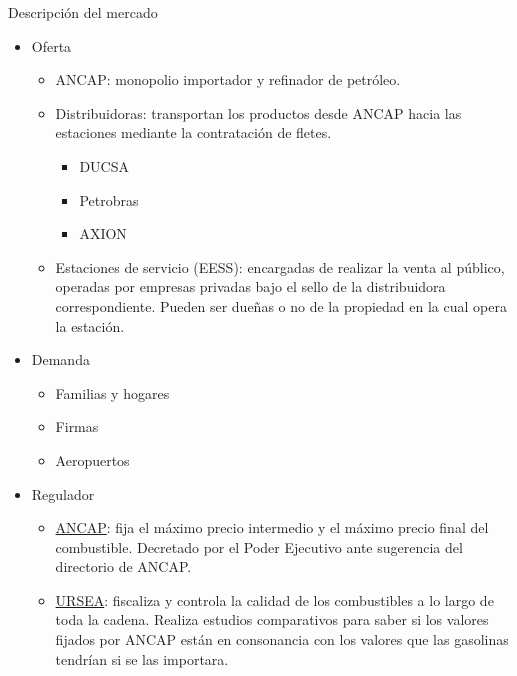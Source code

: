 \documentclass[10pt]{beamer}
\begin{document}
\begin{frame}[allowframebreaks]{Descripción del mercado}

\begin{itemize}
\item Oferta
	\begin{itemize}
	\item ANCAP: monopolio importador y refinador de petróleo.
	\item Distribuidoras: transportan los productos desde ANCAP hacia las estaciones mediante la contratación de fletes.
		\begin{itemize}
		\item DUCSA 
		\item Petrobras
		\item AXION
		\end{itemize}
	\item Estaciones de servicio (EESS): encargadas de realizar la venta al público, operadas por empresas privadas bajo el sello de la distribuidora correspondiente. Pueden ser dueñas o no de la propiedad en la cual opera la estación.
	\end{itemize}
\end{itemize}

\begin{itemize}
\item Demanda
	\begin{itemize}
	\item Familias y hogares
	\item Firmas
	\item Aeropuertos 
	\end{itemize}
\end{itemize}

\framebreak

\begin{itemize}
\item Regulador
	\begin{itemize}
	\item \underline{ANCAP}: fija el máximo precio intermedio y el máximo precio final del combustible. Decretado por el Poder Ejecutivo ante sugerencia del directorio de ANCAP.
	\item \underline{URSEA}: fiscaliza y controla la calidad de los combustibles a lo largo de toda la cadena. Realiza estudios comparativos para saber si los valores fijados por ANCAP están en consonancia con los valores que las gasolinas tendrían si se las importara. 
	\end{itemize}
\end{itemize}
\end{frame}
\end{document}
